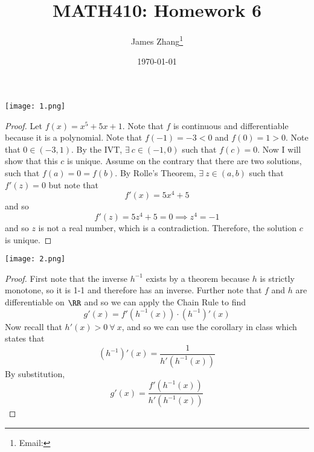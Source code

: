 \documentclass[12pt]{scrartcl}
\begin{document}
\title{MATH410: Homework 6}
\author{James Zhang\thanks{Email: }}
\date{\today}



\maketitle

\texttt{[image: 1.png]}

\begin{proof}
  
\hfill

Let $f(x) = x^5 + 5x + 1$. Note that $f$ is continuous and differentiable because 
it is a polynomial. Note that $f(-1) = -3 < 0$ and $f(0) = 1 > 0$. Note that 
$0 \in (-3, 1)$. By the IVT, $\exists \ c \in (-1, 0)$ such that $f(c) = 0$.
Now I will show that this $c$ is unique. Assume on the contrary that there are two solutions, 
such that $f(a) = 0 = f(b)$. By Rolle's Theorem, 
$\exists \ z \in (a,b)$ such that $f'(z) = 0$ but note that 
\[f'(x) = 5x^4 + 5\]
and so \[f'(z) = 5z^4 + 5 = 0 \implies z^4 = -1\]
and so $z$ is not a real number, which is a contradiction. Therefore, the solution 
$c$ is unique.

\end{proof}

\newpage

\texttt{[image: 2.png]}

\begin{proof}
  
\hfill

First note that the inverse $h^{-1}$ exists by a theorem because 
$h$ is strictly monotone, so it is 1-1 and therefore has an inverse. 
Further note that $f$ and $h$ are differentiable on $\RR$ and so we can 
apply the Chain Rule to find 
\[g'(x) = f'(h^{-1}(x)) \cdot (h^{-1})'(x)\]
Now recall that $h'(x) > 0 \ \forall \ x$, and so we can use the corollary in class which states that 
\[(h^{-1})'(x) = \frac{1}{h'(h^{-1}(x))}\]
By substitution, 
\[g'(x) = \frac{f'(h^{-1}(x))}{h'(h^{-1}(x))}\]

\end{proof}
\end{document}
